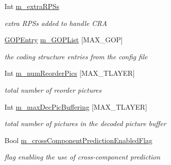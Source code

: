 \begin{DoxyCompactItemize}
\mbox{\label{class_t_app_enc_cfg_a03843364d4170f691712cb1e73792a7d}} 
Int \hyperlink{class_t_app_enc_cfg_a03843364d4170f691712cb1e73792a7d}{m\+\_\+extra\+R\+P\+Ss}
\begin{DoxyCompactList}\small\item\em extra R\+P\+Ss added to handle C\+RA \end{DoxyCompactList}\item 
\mbox{\label{class_t_app_enc_cfg_ad0e50ba683b2bf7edf6b28cba06395e1}} 
\hyperlink{struct_g_o_p_entry}{G\+O\+P\+Entry} \hyperlink{class_t_app_enc_cfg_ad0e50ba683b2bf7edf6b28cba06395e1}{m\+\_\+\+G\+O\+P\+List} \mbox{[}M\+A\+X\+\_\+\+G\+OP\mbox{]}
\begin{DoxyCompactList}\small\item\em the coding structure entries from the config file \end{DoxyCompactList}\item 
\mbox{\label{class_t_app_enc_cfg_a3a366f66524b8974764231c0c9b9c739}} 
Int \hyperlink{class_t_app_enc_cfg_a3a366f66524b8974764231c0c9b9c739}{m\+\_\+num\+Reorder\+Pics} \mbox{[}M\+A\+X\+\_\+\+T\+L\+A\+Y\+ER\mbox{]}
\begin{DoxyCompactList}\small\item\em total number of reorder pictures \end{DoxyCompactList}\item 
\mbox{\label{class_t_app_enc_cfg_a0d18b8cd2368b941146c8e8bf76ef4c6}} 
Int \hyperlink{class_t_app_enc_cfg_a0d18b8cd2368b941146c8e8bf76ef4c6}{m\+\_\+max\+Dec\+Pic\+Buffering} \mbox{[}M\+A\+X\+\_\+\+T\+L\+A\+Y\+ER\mbox{]}
\begin{DoxyCompactList}\small\item\em total number of pictures in the decoded picture buffer \end{DoxyCompactList}\item 
\mbox{\label{class_t_app_enc_cfg_a75dbb6e1c65d2e4ee1df3e157f9bdd60}} 
Bool \hyperlink{class_t_app_enc_cfg_a75dbb6e1c65d2e4ee1df3e157f9bdd60}{m\+\_\+cross\+Component\+Prediction\+Enabled\+Flag}
\begin{DoxyCompactList}\small\item\em flag enabling the use of cross-\/component prediction \end{DoxyCompactList}\item 

\end{DoxyCompactItemize}
